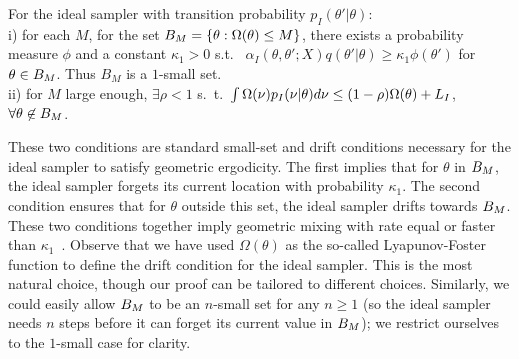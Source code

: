 \begin{assumption}
For the ideal sampler with transition probability $p_I(\theta'|\theta)$: \\
i) for each $M$, for the set $B_M=\{\theta:\Omega(\theta)\le M \}$,
there exists a probability measure $\phi$ and a constant
$\kappa_1 > 0$ s.t.\ %
$\alpha_I(\theta, \theta'; X) q(\theta' | \theta) \ge \kappa_1 \phi(\theta')$
 for $\theta \in B_M$. 
Thus $B_M$ is a $1$-small set. \\
ii) for $M$ large enough, $\exists \rho < 1$ s.\ t.\
$\int \Omega(\nu) p_I(\nu|\theta) d\nu
\leq (1-\rho) \Omega(\theta)+L_I$, $\forall \theta \not\in B_M$.
  \label{asmp:ideal_geom}
\end{assumption}
\noindent %
These two conditions are standard
small-set and drift conditions necessary for the ideal sampler to satisfy
geometric ergodicity. The first implies that for $\theta$ in
$B_M$, the ideal sampler forgets its current
location with probability $\kappa_1$. The second condition ensures that
for $\theta$ outside this set, the ideal sampler drifts towards
$B_M$. These two conditions together imply geometric
mixing with rate equal or faster than $\kappa_1$~\cite{meyn2009}.
Observe that we have used $\Omega(\theta)$ as the so-called 
Lyapunov-Foster function to define the drift condition for the ideal 
sampler. %
This is the most natural choice,
though our proof can be tailored to different choices. Similarly, we
could easily allow $B_M$ to be an $n$-small set for any $n\ge 1$ (so
the ideal sampler needs $n$ steps before it can forget its current
value in $B_M$); we restrict ourselves to the $1$-small case for
clarity.




